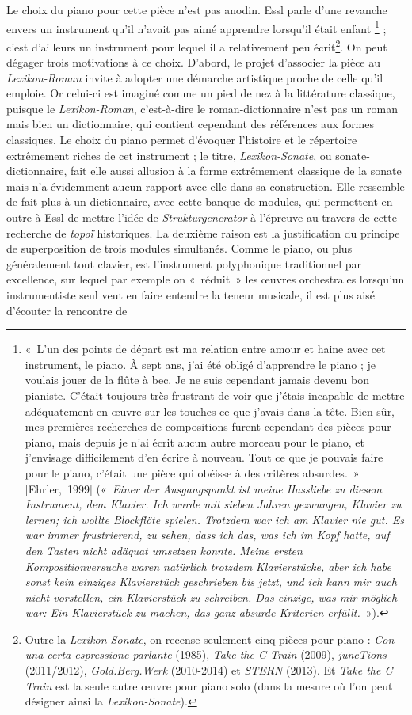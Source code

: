 \documentclass[a4paper,12pt]{article}
\newcommand{\guill}[1]{«~#1~»}
\newcommand{\cicite}[1]{{\footnotesize[#1]}}
\begin{document}
Le choix du piano pour cette pièce n'est pas anodin. Essl parle d'une revanche envers un instrument qu'il n'avait pas aimé apprendre lorsqu'il était enfant
\footnote{\guill{L'un des points de départ est ma relation entre amour et haine avec cet instrument, le piano. À sept ans, j'ai été obligé d'apprendre le piano ; je voulais jouer de la flûte à bec. Je ne suis cependant jamais devenu bon pianiste. C'était toujours très frustrant de voir que j'étais incapable de mettre adéquatement en œuvre sur les touches ce que j'avais dans la tête. Bien sûr, mes premières recherches de compositions furent cependant des pièces pour piano, mais depuis je n'ai écrit aucun autre morceau pour le piano, et j'envisage difficilement d'en écrire à nouveau. Tout ce que je pouvais faire pour le piano, c'était une pièce qui obéisse à des critères absurdes.} \cicite{Ehrler,~1999} (\guill{\emph{Einer der Ausgangspunkt ist meine Hassliebe zu diesem Instrument, dem Klavier. Ich wurde mit sieben Jahren gezwungen, Klavier zu lernen\!; ich wollte Blockflöte spielen. Trotzdem war ich am Klavier nie gut. Es war immer frustrierend, zu sehen, dass ich das, was ich im Kopf hatte, auf den Tasten nicht adäquat umsetzen konnte. Meine ersten Kompositionversuche waren natürlich trotzdem Klavierstücke, aber ich habe sonst kein einziges Klavierstück geschrieben bis jetzt, und ich kann mir auch nicht vorstellen, ein Klavierstück zu schreiben. Das einzige, was mir möglich war\!: Ein Klavierstück zu machen, das ganz absurde Kriterien erfüllt.}}).} ; c'est d'ailleurs un instrument pour lequel il a relativement peu écrit\footnote{Outre la \emph{Lexikon-Sonate}, on recense seulement cinq pièces pour piano : \emph{Con una certa espressione parlante} (1985), \emph{Take the C Train} (2009), \emph{juncTions} (2011/2012), \emph{Gold.Berg.Werk} (2010-2014) et \emph{STERN} (2013). Et \emph{Take the C Train} est la seule autre œuvre pour piano solo (dans la mesure où l'on peut désigner ainsi la \emph{Lexikon-Sonate}).}. On peut dégager trois motivations à ce choix. D'abord, le projet d'associer la pièce au \emph{Lexikon-Roman} invite à adopter une démarche artistique proche de celle qu'il emploie. Or celui-ci est imaginé comme un pied de nez à la littérature classique, puisque le \emph{Lexikon-Roman}, c'est-à-dire le roman-dictionnaire n'est pas un roman mais bien un dictionnaire, qui contient cependant des références aux formes classiques. Le choix du piano permet d'évoquer l'histoire et le répertoire extrêmement riches de cet instrument ; le titre, \emph{Lexikon-Sonate}, ou sonate-dictionnaire, fait elle aussi allusion à la forme extrêmement classique de la sonate mais n'a évidemment aucun rapport avec elle dans sa construction. Elle ressemble de fait plus à un dictionnaire, avec cette banque de modules, qui permettent en outre à Essl de mettre l'idée de \emph{Strukturgenerator} à l'épreuve au travers de cette recherche de \emph{topoï} historiques. La deuxième raison est la justification du principe de superposition de trois modules simultanés. Comme le piano, ou plus généralement tout clavier, est l'instrument polyphonique traditionnel par excellence, sur lequel par exemple on \guill{réduit} les œuvres orchestrales lorsqu'un instrumentiste seul veut en faire entendre la teneur musicale, il est plus aisé d'écouter la rencontre de 
\end{document}
